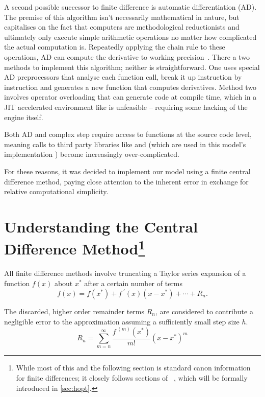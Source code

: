 A second possible successor to finite difference is automatic differentiation (AD).
The premise of this algorithm isn't necessarily mathematical in nature, but capitalises on the fact that computers are methodological reductionists and ultimately only execute simple arithmetic operations no matter how complicated the actual computation is.
Repeatedly applying the chain rule to these operations, AD can compute the derivative to working precision~\cite{Kedem1980}.
There a two methods to implement this algorithm; neither is straightforward.
One uses special AD preprocessors that analyse each function call, break it up instruction by instruction and generates a new function that computes derivatives.
Method two involves operator overloading that can generate code at compile time, which in a JIT accelerated environment like  is unfeasible -- requiring some hacking of the engine itself.

Both AD and complex step require access to functions at the source code level, meaning calls to third party libraries like  and  (which are used in this model's implementation ) become increasingly over-complicated.

For these reasons, it was decided to implement our model using a finite central difference method, paying close attention to the inherent error in exchange for relative computational simplicity.

\section[Understanding Central Differences]{Understanding the Central Difference Method\footnote{While most of this and the following section is standard canon information for finite differences; it closely follows sections of \citeauthor{Mathur2012}~\cite{Mathur2012}, which will be formally introduced in \cref{sec:hopt}.}}\label{sec:ucdiff}

All finite difference methods involve truncating a Taylor series expansion of a function $f(x)$ about $x^*$ after a certain number of terms
\begin{equation}
    f(x) = f(x^*) + f^{\;\prime}(x)(x-x^*) + \cdots + R_n.
\end{equation}

The discarded, higher order remainder terms $R_n$, are considered to contribute a negligible error to the approximation assuming a sufficiently small step size $h$.
\begin{equation}
    R_n = \sum_{m=n}^\infty \frac{f^{\;(m)}(x^*)}{m!}(x-x^*)^m
\end{equation}

